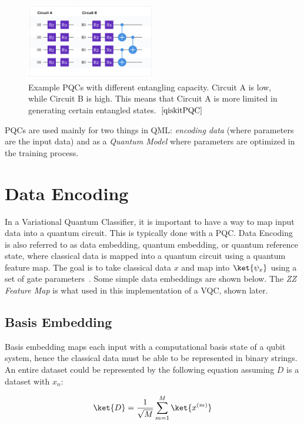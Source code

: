 \documentclass[11pt]{article}
\begin{document}
\begin{figure}[!h]
    \centering
    \includegraphics[width=0.50\textwidth]{./figures/Entangling-Capacity.png} 
    \caption{Example PQCs with different entangling capacity. Circuit A is low, while Circuit B is high. This means 
    that Circuit A is more limited in generating certain entangled states.~$\cite{qiskitPQC}$ }
    \label{fig:entangling-cap}
\end{figure}

PQCs are used mainly for two things in QML: \textit{encoding data} (where parameters are the input data) and as a 
\textit{Quantum Model}
where parameters are optimized in the training process.

\section{Data Encoding}\label{embedding}

In a Variational Quantum Classifier, it is important to have a way to map input data into a quantum circuit. This is typically done
with a PQC. Data Encoding is also referred to as data embedding, quantum embedding, or quantum reference state, 
where classical data is mapped into a quantum circuit using a quantum feature map. The goal is to take classical data $x$ 
and map into $\ket{\psi_x}$ using a set of gate parameters~\cite{SCHULD_2019_BOOK}. Some simple data embeddings are shown below. 
The \textit{ZZ Feature Map} is what used in this implementation of a VQC, shown later.

\subsection*{Basis Embedding}

Basis embedding maps each input with a computational basis state of a qubit system, hence the classical data must be 
able to be represented in binary strings. An entire dataset could be represented by the following equation assuming
 $D$ is a dataset with $x_n$: \cite{pennylaneQE}

 \[
    \ket{D} = \frac{1}{\sqrt{M}}\sum_{m=1}^{M}\ket{x^{(m)}}
 \]
\end{document}
